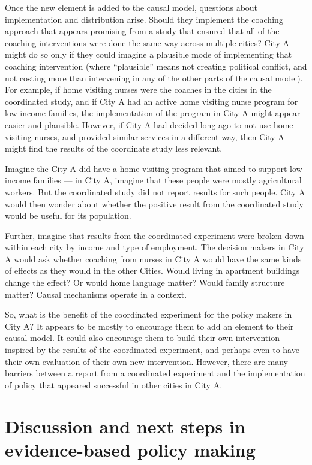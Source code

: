 \documentclass[
  11pt,
]{article}
\begin{document}
Once the new element is added to the causal model, questions about
implementation and distribution arise. Should they implement the
coaching approach that appears promising from a study that ensured that
all of the coaching interventions were done the same way across multiple
cities? City A might do so only if they could imagine a plausible mode
of implementing that coaching intervention (where ``plausible'' means
not creating political conflict, and not costing more than intervening
in any of the other parts of the causal model). For example, if home
visiting nurses were the coaches in the cities in the coordinated study,
and if City A had an active home visiting nurse program for low income
families, the implementation of the program in City A might appear
easier and plausible. However, if City A had decided long ago to not use
home visiting nurses, and provided similar services in a different way,
then City A might find the results of the coordinate study less
relevant.

Imagine the City A did have a home visiting program that aimed to
support low income families --- in City A, imagine that these people
were mostly agricultural workers. But the coordinated study did not
report results for such people. City A would then wonder about whether
the positive result from the coordinated study would be useful for its
population.

Further, imagine that results from the coordinated experiment were
broken down within each city by income and type of employment. The
decision makers in City A would ask whether coaching from nurses in City
A would have the same kinds of effects as they would in the other
Cities. Would living in apartment buildings change the effect? Or would
home language matter? Would family structure matter? Causal mechanisms
operate in a context.

So, what is the benefit of the coordinated experiment for the policy
makers in City A? It appears to be mostly to encourage them to add an
element to their causal model. It could also encourage them to build
their own intervention inspired by the results of the coordinated
experiment, and perhaps even to have their own evaluation of their own
new intervention. However, there are many barriers between a report from
a coordinated experiment and the implementation of policy that appeared
successful in other cities in City A.

\hypertarget{discussion-and-next-steps-in-evidence-based-policy-making}{%
\section{Discussion and next steps in evidence-based policy
making}\label{discussion-and-next-steps-in-evidence-based-policy-making}}
\end{document}
